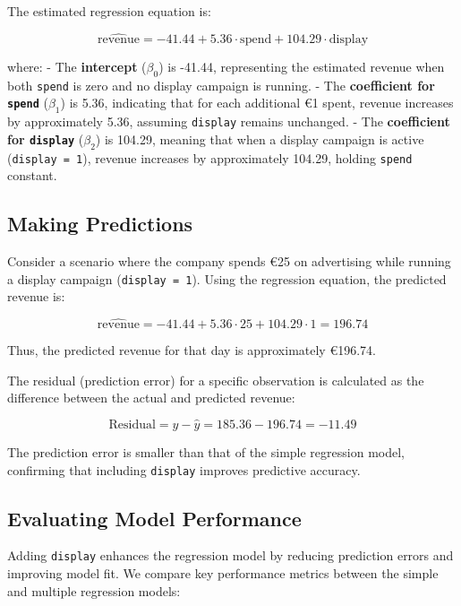 \documentclass[
  11pt,
]{book}
\theoremstyle{definition}
\theoremstyle{definition}
\theoremstyle{definition}
\theoremstyle{definition}
\theoremstyle{remark}
\begin{document}
The estimated regression equation is:

\[
\hat{\text{revenue}} = -41.44 + 5.36 \cdot \text{spend} + 104.29 \cdot \text{display}
\]

where:
- The \textbf{intercept} (\(\beta_0\)) is -41.44, representing the estimated revenue when both \texttt{spend} is zero and no display campaign is running.
- The \textbf{coefficient for \texttt{spend}} (\(\beta_1\)) is 5.36, indicating that for each additional €1 spent, revenue increases by approximately 5.36, assuming \texttt{display} remains unchanged.
- The \textbf{coefficient for \texttt{display}} (\(\beta_2\)) is 104.29, meaning that when a display campaign is active (\texttt{display\ =\ 1}), revenue increases by approximately 104.29, holding \texttt{spend} constant.

\subsection*{Making Predictions}\label{making-predictions}


Consider a scenario where the company spends €25 on advertising while running a display campaign (\texttt{display\ =\ 1}). Using the regression equation, the predicted revenue is:

\[
\hat{\text{revenue}} = -41.44 + 5.36 \cdot 25 + 104.29 \cdot 1 = 196.74
\]

Thus, the predicted revenue for that day is approximately €196.74.

The residual (prediction error) for a specific observation is calculated as the difference between the actual and predicted revenue:

\[
\text{Residual} = y - \hat{y} = 185.36 - 196.74 = -11.49
\]

The prediction error is smaller than that of the simple regression model, confirming that including \texttt{display} improves predictive accuracy.

\subsection*{Evaluating Model Performance}\label{evaluating-model-performance}


Adding \texttt{display} enhances the regression model by reducing prediction errors and improving model fit. We compare key performance metrics between the simple and multiple regression models:
\end{document}
